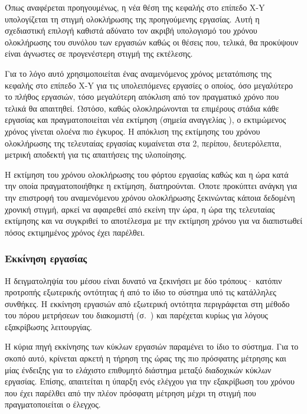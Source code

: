 Όπως αναφέρεται προηγουμένως, η νέα θέση της κεφαλής στο επίπεδο X-Y
υπολογίζεται τη στιγμή ολοκλήρωσης της προηγούμενης εργασίας. Αυτή η σχεδιαστική
επιλογή καθιστά αδύνατο τον ακριβή υπολογισμό του χρόνου ολοκλήρωσης του συνόλου
των εργασιών καθώς οι θέσεις που, τελικά, θα προκύψουν είναι άγνωστες σε
προγενέστερη στιγμή της εκτέλεσης.

Για το λόγο αυτό χρησιμοποιείται ένας αναμενόμενος χρόνος μετατόπισης της
κεφαλής στο επίπεδο X-Y για τις υπολειπόμενες εργασίες ο οποίος, όσο μεγαλύτερο
το πλήθος εργασιών, τόσο μεγαλύτερη απόκλιση από τον πραγματικό χρόνο που
τελικά θα απαιτηθεί. Ωστόσο, καθώς ολοκληρώνονται τα επιμέρους στάδια κάθε
εργασίας και πραγματοποιείται νέα εκτίμηση (σημεία αναγγελίας ), ο
εκτιμώμενος χρόνος γίνεται ολοένα πιο έγκυρος. Η απόκλιση της εκτίμησης του
χρόνου ολοκλήρωσης της τελευταίας εργασίας κυμαίνεται στα 2, περίπου,
δευτερόλεπτα, μετρική αποδεκτή για τις απαιτήσεις της υλοποίησης.

Η εκτίμηση του χρόνου ολοκλήρωσης του φόρτου εργασίας καθώς και η ώρα κατά την
οποία πραγματοποιήθηκε η εκτίμηση, διατηρούνται. Όποτε προκύπτει ανάγκη για την
επιστροφή του αναμενόμενου χρόνου ολοκλήρωσης ξεκινώντας κάποια δεδομένη χρονική
στιγμή, αρκεί να αφαιρεθεί από εκείνη την ώρα, η ώρα της τελευταίας εκτίμησης
και να συγκριθεί το αποτέλεσμα με την εκτίμηση χρόνου για να διαπιστωθεί πόσος
εκτιμημένος χρόνος έχει παρέλθει.


\subsubsection{Εκκίνηση εργασίας}
\label{ssubsec:task:initiate}

Η δειγματοληψία του μέσου είναι δυνατό να ξεκινήσει με δύο τρόπους· κατόπιν
προτροπής εξωτερικής οντότητας ή από το ίδιο το σύστημα υπό τις κατάλληλες
συνθήκες. Η εκκίνηση εργασιών από εξωτερική οντότητα περιγράφεται στη μέθοδο
 του πόρου μετρήσεων του διακομιστή
(σ.~\pageref{ssubsec:network:measurement-post}) και παρέχεται κυρίως για λόγους
εξακρίβωσης λειτουργίας.

Η κύρια πηγή εκκίνησης των κύκλων εργασιών παραμένει το ίδιο το σύστημα.
Για το σκοπό αυτό, κρίνεται
αρκετή η τήρηση της ώρας της πιο πρόσφατης μέτρησης και μίας ένδειξης για το
ελάχιστο επιθυμητό διάστημα μεταξύ διαδοχικών κύκλων εργασίας. Επίσης,
απαιτείται η ύπαρξη ενός ελέγχου για την εξακρίβωση του χρόνου που έχει παρέλθει
από την πλέον πρόσφατη μέτρηση μέχρι τη στιγμή που πραγματοποιείται ο έλεγχος.

